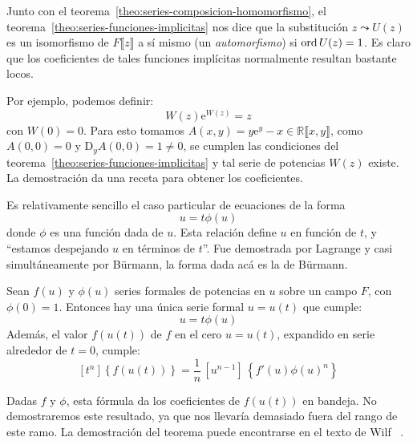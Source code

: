   Junto con el teorema~\ref{theo:series-composicion-homomorfismo},
  el teorema~\ref{theo:series-funciones-implicitas}
  nos dice que la substitución
  \(z \leadsto U(z)\) es un isomorfismo
  de \(F \llbracket z \rrbracket\) a sí mismo
  (un \emph{automorfismo})%
  si \(\operatorname{ord} U(z) = 1\).
  Es claro que los coeficientes de tales funciones implícitas
  normalmente resultan bastante locos.

  Por ejemplo,
  podemos definir:
  \begin{equation*}
    W(z) \mathrm{e}^{W(z)}
      = z
  \end{equation*}
  con \(W(0) = 0\).
  Para esto tomamos
    \(A(x, y) = y \mathrm{e}^y - x \in \mathbb{R} \llbracket x, y \rrbracket\),
  como \(A(0, 0) = 0\) y \(\mathrm{D}_y A(0, 0) = 1 \ne 0\),
  se cumplen las condiciones del teorema~\ref{theo:series-funciones-implicitas}
  y tal serie de potencias \(W(z)\) existe.
  La demostración da una receta para obtener los coeficientes.

  Es relativamente sencillo el caso particular de ecuaciones de la forma
  \begin{equation*}
    u = t \phi(u)
  \end{equation*}
  donde \(\phi\) es una función dada de \(u\).
  Esta relación define \(u\) en función de \(t\),
  y ``estamos despejando \(u\) en términos de \(t\)''.
  Fue demostrada por Lagrange%
  y casi simultáneamente por Bürmann,%
  la forma dada acá es la de Bürmann.
  \begin{theorem}
    \label{theo:LIF}
    Sean \(f(u)\) y \(\phi(u)\) series formales de potencias en \(u\)
    sobre un campo \(F\),
    con \(\phi(0) = 1\).
    Entonces hay una única serie formal \(u = u(t)\) que cumple:
    \begin{equation*}
      u = t \phi(u)
    \end{equation*}
    Además,
    el valor \(f(u(t))\) de \(f\) en el cero \(u = u(t)\),
    expandido en serie alrededor de \(t = 0\),
    cumple:
    \begin{equation*}
      \left[ t^n \right] \left\{ f(u(t)) \right\}
	 = \frac{1}{n} \, \left[ u^{n - 1} \right] \,
			    \left\{ f'(u) \phi(u)^n \right\}
    \end{equation*}
  \end{theorem}
  Dadas \(f\) y \(\phi\),
  esta fórmula da los coeficientes de \(f(u(t))\) en bandeja.
  No demostraremos este resultado,
  ya que nos llevaría demasiado fuera del rango de este ramo.
  La demostración del teorema puede encontrarse en el texto de Wilf~%
    \cite{wilf06:_gfology}.

